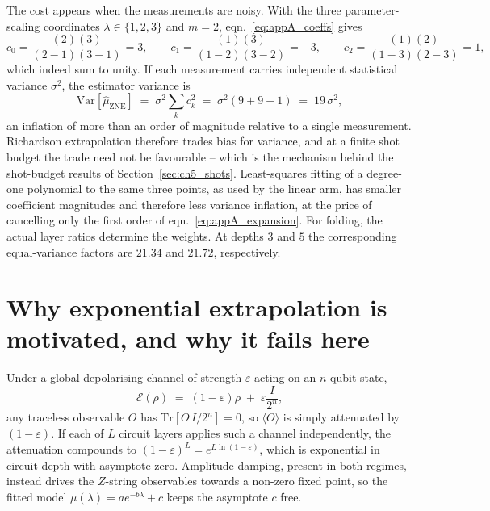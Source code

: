 The cost appears when the measurements are noisy. With the three
parameter-scaling coordinates $\lambda \in \{1,2,3\}$ and $m=2$,
eqn.~\eqref{eq:appA_coeffs} gives
\begin{equation}
    c_0 = \frac{(2)(3)}{(2-1)(3-1)} = 3,
    \qquad
    c_1 = \frac{(1)(3)}{(1-2)(3-2)} = -3,
    \qquad
    c_2 = \frac{(1)(2)}{(1-3)(2-3)} = 1,
    \label{eq:appA_values}
\end{equation}
which indeed sum to unity. If each measurement carries independent statistical
variance $\sigma^2$, the estimator variance is
\begin{equation}
    \mathrm{Var}\!\left[ \widehat{\mu}_{\text{ZNE}} \right]
    \;=\; \sigma^2 \sum_{k} c_k^{2}
    \;=\; \sigma^2 \left( 9 + 9 + 1 \right)
    \;=\; 19\,\sigma^2 ,
    \label{eq:appA_variance}
\end{equation}
an inflation of more than an order of magnitude relative to a single measurement.
Richardson extrapolation therefore trades bias for variance, and at a finite shot
budget the trade need not be favourable -- which is the mechanism behind the
shot-budget results of Section~\ref{sec:ch5_shots}. Least-squares fitting of a
degree-one polynomial to the same three points, as used by the linear arm, has
smaller coefficient magnitudes and therefore less variance inflation, at the price of
cancelling only the first order of eqn.~\eqref{eq:appA_expansion}.
For folding, the actual layer ratios determine the weights. At depths
$3$ and $5$ the corresponding equal-variance factors are $21.34$ and
$21.72$, respectively.

\section{Why exponential extrapolation is motivated, and why it fails here}
\label{sec:appA_exp}

Under a global depolarising channel of strength $\varepsilon$ acting on an
$n$-qubit state,
\begin{equation}
    \mathcal{E}(\rho) \;=\; (1 - \varepsilon)\rho \;+\; \varepsilon \frac{I}{2^{n}},
    \label{eq:appA_global}
\end{equation}
any traceless observable $O$ has $\mathrm{Tr}[O \, I/2^n] = 0$, so
$\langle O \rangle$ is simply attenuated by $(1 - \varepsilon)$. If each of $L$
circuit layers applies such a channel independently, the attenuation compounds to
$(1-\varepsilon)^{L} = e^{L \ln (1 - \varepsilon)}$, which is exponential in circuit
depth with asymptote zero. Amplitude damping, present in both regimes, instead drives
the $Z$-string observables towards a non-zero fixed point, so the fitted model
$\mu(\lambda) = a e^{-b \lambda} + c$ keeps the asymptote $c$ free.

